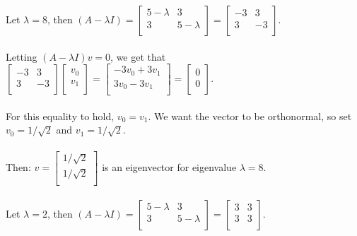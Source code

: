 \documentclass[11pt]{article}
\begin{document}
Let $\lambda = 8$, then $(A - \lambda I) = \begin{bmatrix}
5 - \lambda & 3 \\
3 & 5 - \lambda \\
\end{bmatrix} = \begin{bmatrix}
-3 & 3 \\
3 & -3 \\
\end{bmatrix}$. \\\\
Letting $(A - \lambda I)v = 0$, we get that $ \begin{bmatrix}
-3 & 3 \\
3 & -3 \\
\end{bmatrix} \begin{bmatrix}
v_0 \\
v_1 \\
\end{bmatrix} = \begin{bmatrix}
-3v_0 + 3v_1 \\
3v_0 -3v_1 \\
\end{bmatrix} = \begin{bmatrix}
0 \\
0 \\
\end{bmatrix} $. \\\\
For this equality to hold, $v_0 = v_1$. We want the vector to be orthonormal, so set $v_0 = 1 / \sqrt2$ and $v_1 = 1 / \sqrt2.$ \\\\
Then: $v = \begin{bmatrix}
1 / \sqrt2 \\
1 / \sqrt2 \\
\end{bmatrix}$ is an eigenvector for eigenvalue $\lambda = 8$. \\\\
Let $\lambda = 2$, then $(A - \lambda I) = \begin{bmatrix}
5 - \lambda & 3 \\
3 & 5 - \lambda \\
\end{bmatrix} = \begin{bmatrix}
3 & 3 \\
3 & 3 \\
\end{bmatrix}$. \\\\
\end{document}
